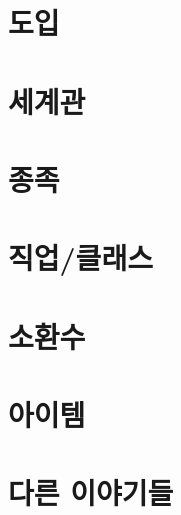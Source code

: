 \documentclass{report}
\begin{document}
	\setcounter{parttocdepth}{3}
	\parttoc
	\setcounter{parttocdepth}{1}
	
	\chapter{도입}
		
	
	\chapter{세계관}
		
	
	\chapter{종족}
		
	
	\chapter{직업/클래스}
		
	
	\chapter{소환수}
		
	
	\chapter{아이템}
		
	
	\chapter{다른 이야기들}
		
\end{document}
